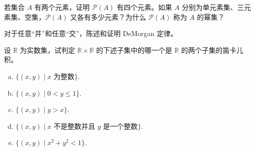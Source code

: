 \documentclass[../../main.tex]{subfiles}
\begin{document}
\begin{exercise}\label{exercise:ch01-基本概念-8}
若集合 $A$ 有两个元素，证明 $\mathcal{P}(A)$ 有四个元素。如果 $A$ 分别为单元素集、三元素集、空集，$\mathcal{P}(A)$ 又各有多少元素？为什么 $\mathcal{P}(A)$ 称为 $A$ 的幂集？
\end{exercise}

\begin{exercise}\label{exercise:ch01-基本概念-9}
对于任意“并”和任意“交”，陈述和证明 DeMorgan 定律。
\end{exercise}

\begin{exercise}\label{exercise:ch01-基本概念-10}
设 $\mathbb{R}$ 为实数集，试判定 $\mathbb{R} \times \mathbb{R}$ 的下述子集中的哪一个是 $\mathbb{R}$ 的两个子集的笛卡儿积。
\begin{enumerate}[(a)]
\item $\{(x, y) \mid x \text{ 为整数}\}$.
\item $\{(x, y) \mid 0 < y \leqslant 1\}$.
\item $\{(x, y) \mid y > x\}$.
\item $\{(x, y) \mid x \text{ 不是整数并且 } y \text{ 是一个整数}\}$.
\item $\{(x, y) \mid x^{2} + y^{2} < 1\}$.
\end{enumerate}
\end{exercise}
\end{document}
